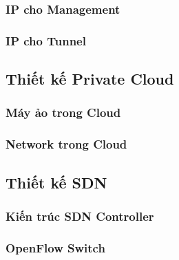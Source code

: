 \subsubsection{IP cho Management}

\subsubsection{IP cho Tunnel}

\subsection{Thiết kế Private Cloud}

\subsubsection{Máy ảo trong Cloud}

\subsubsection{Network trong Cloud}

\subsection{Thiết kế SDN}

\subsubsection{Kiến trúc SDN Controller}

\subsubsection{OpenFlow Switch}

